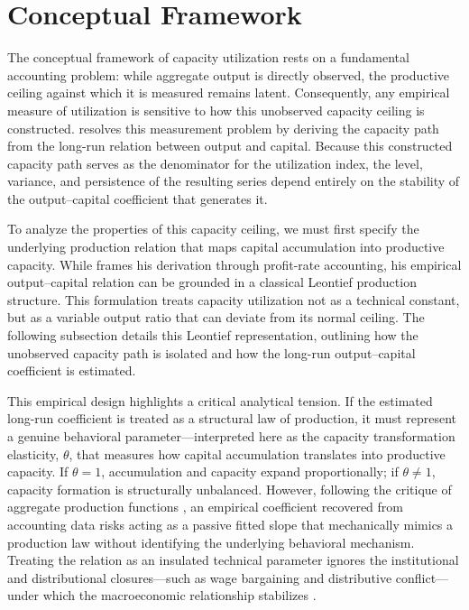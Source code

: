 \documentclass[11pt]{article}
\begin{document}
\section{Conceptual Framework}
\label{sec:conceptual_framework}

The conceptual framework of capacity utilization rests on a fundamental accounting problem: while aggregate output is directly observed, the productive ceiling against which it is measured remains latent. Consequently, any empirical measure of utilization is sensitive to how this unobserved capacity ceiling is constructed. \citet{Shaikh2016} resolves this measurement problem by deriving the capacity path from the long-run relation between output and capital. Because this constructed capacity path serves as the denominator for the utilization index, the level, variance, and persistence of the resulting series depend entirely on the stability of the output--capital coefficient that generates it.

To analyze the properties of this capacity ceiling, we must first specify the underlying production relation that maps capital accumulation into productive capacity. While \citet{Shaikh2016} frames his derivation through profit-rate accounting, his empirical output--capital relation can be grounded in a classical Leontief production structure. This formulation treats capacity utilization not as a technical constant, but as a variable output ratio that can deviate from its normal ceiling. The following subsection details this Leontief representation, outlining how the unobserved capacity path is isolated and how the long-run output--capital coefficient is estimated.

This empirical design highlights a critical analytical tension. If the estimated long-run coefficient is treated as a structural law of production, it must represent a genuine behavioral parameter—interpreted here as the capacity transformation elasticity, $\theta$, that measures how capital accumulation translates into productive capacity. If $\theta = 1$, accumulation and capacity expand proportionally; if $\theta \neq 1$, capacity formation is structurally unbalanced. However, following the critique of aggregate production functions \citep{Shaikh1974}, an empirical coefficient recovered from accounting data risks acting as a passive fitted slope that mechanically mimics a production law without identifying the underlying behavioral mechanism. Treating the relation as an insulated technical parameter ignores the institutional and distributional closures—such as wage bargaining and distributive conflict—under which the macroeconomic relationship stabilizes \citep{Nikiforos2021closure}.
\end{document}
